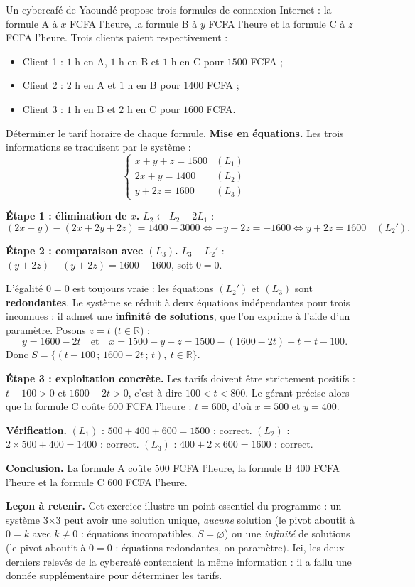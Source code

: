 \documentclass[11pt]{article}
\begin{document}
\begin{exoresolu}
Un cybercafé de Yaoundé propose trois formules de connexion Internet : la formule A à $x$ FCFA l'heure, la formule B à $y$ FCFA l'heure et la formule C à $z$ FCFA l'heure. Trois clients paient respectivement :
\begin{itemize}
\item Client 1 : $1$ h en A, $1$ h en B et $1$ h en C pour $\num{1500}$ FCFA ;
\item Client 2 : $2$ h en A et $1$ h en B pour $\num{1400}$ FCFA ;
\item Client 3 : $1$ h en B et $2$ h en C pour $\num{1600}$ FCFA.
\end{itemize}
Déterminer le tarif horaire de chaque formule.
\tcblower
\textbf{Mise en équations.} Les trois informations se traduisent par le système :
\[
\begin{cases}
x+y+z=1500 & (L_1)\\
2x+y=1400 & (L_2)\\
y+2z=1600 & (L_3)
\end{cases}
\]

\textbf{Étape 1 : élimination de $x$.} $L_2\leftarrow L_2-2L_1$ :
\[ (2x+y)-(2x+2y+2z)=1400-3000 \iff -y-2z=-1600 \iff y+2z=1600 \quad (L_2'). \]

\textbf{Étape 2 : comparaison avec $(L_3)$.} $L_3-L_2'$ : $(y+2z)-(y+2z)=1600-1600$, soit $0=0$.

L'égalité $0=0$ est toujours vraie : les équations $(L_2')$ et $(L_3)$ sont \textbf{redondantes}. Le système se réduit à deux équations indépendantes pour trois inconnues : il admet une \textbf{infinité de solutions}, que l'on exprime à l'aide d'un paramètre. Posons $z=t$ ($t\in\mathbb{R}$) :
\[ y=1600-2t \quad\text{et}\quad x=1500-y-z=1500-(1600-2t)-t=t-100. \]
Donc $S=\{(t-100\,;\,1600-2t\,;\,t),\ t\in\mathbb{R}\}$.

\textbf{Étape 3 : exploitation concrète.} Les tarifs doivent être strictement positifs : $t-100>0$ et $1600-2t>0$, c'est-à-dire $100<t<800$. Le gérant précise alors que la formule C coûte $600$ FCFA l'heure : $t=600$, d'où $x=500$ et $y=400$.

\textbf{Vérification.} $(L_1)$ : $500+400+600=1500$ : correct. $(L_2)$ : $2\times 500+400=1400$ : correct. $(L_3)$ : $400+2\times 600=1600$ : correct.

\textbf{Conclusion.} La formule A coûte $500$ FCFA l'heure, la formule B $400$ FCFA l'heure et la formule C $600$ FCFA l'heure.

\textbf{Leçon à retenir.} Cet exercice illustre un point essentiel du programme : un système 3$\times$3 peut avoir une solution unique, \emph{aucune} solution (le pivot aboutit à $0=k$ avec $k\neq 0$ : équations incompatibles, $S=\varnothing$) ou une \emph{infinité} de solutions (le pivot aboutit à $0=0$ : équations redondantes, on paramètre). Ici, les deux derniers relevés de la cybercafé contenaient la même information : il a fallu une donnée supplémentaire pour déterminer les tarifs.
\end{exoresolu}
\end{document}
